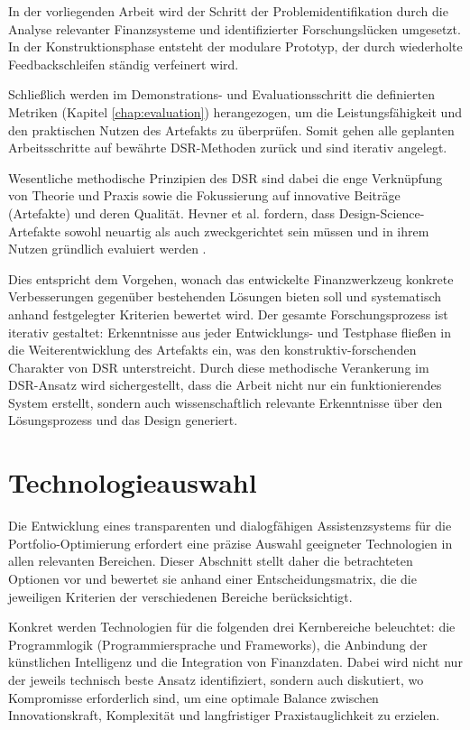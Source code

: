     In der vorliegenden Arbeit wird der Schritt der Problemidentifikation durch die Analyse relevanter Finanzsysteme und identifizierter Forschungslücken umgesetzt.
    In der Konstruktionsphase entsteht der modulare Prototyp, der durch wiederholte Feedbackschleifen ständig verfeinert wird.

    Schließlich werden im Demonstrations- und Evaluationsschritt die definierten Metriken (Kapitel \ref{chap:evaluation}) herangezogen, um die Leistungsfähigkeit und den praktischen Nutzen des Artefakts zu überprüfen.
    Somit gehen alle geplanten Arbeitsschritte auf bewährte \acs{DSR}-Methoden zurück und sind iterativ angelegt.

    Wesentliche methodische Prinzipien des \acs{DSR} sind dabei die enge Verknüpfung von Theorie und Praxis sowie die Fokussierung auf innovative Beiträge (Artefakte) und deren Qualität.
    Hevner et al. fordern, dass Design-Science-Artefakte sowohl neuartig als auch zweckgerichtet sein müssen und in ihrem Nutzen gründlich evaluiert werden \autocite{hevner2004}.

    Dies entspricht dem Vorgehen, wonach das entwickelte Finanzwerkzeug konkrete Verbesserungen gegenüber bestehenden Lösungen bieten soll und systematisch anhand festgelegter Kriterien bewertet wird.
    Der gesamte Forschungsprozess ist iterativ gestaltet:
    Erkenntnisse aus jeder Entwicklungs- und Testphase fließen in die Weiterentwicklung des Artefakts ein, was den konstruktiv-forschenden Charakter von \acs{DSR} unterstreicht.
    Durch diese methodische Verankerung im \acs{DSR}-Ansatz wird sichergestellt, dass die Arbeit nicht nur ein funktionierendes System erstellt, sondern auch wissenschaftlich relevante Erkenntnisse über den Lösungsprozess und das Design generiert.

\section{Technologieauswahl} %

    Die Entwicklung eines transparenten und dialogfähigen Assistenzsystems für die Portfolio-Optimierung erfordert eine präzise Auswahl geeigneter Technologien in allen relevanten Bereichen.
    Dieser Abschnitt stellt daher die betrachteten Optionen vor und bewertet sie anhand einer Entscheidungsmatrix, die die jeweiligen Kriterien der verschiedenen Bereiche berücksichtigt.

    Konkret werden Technologien für die folgenden drei Kernbereiche beleuchtet: die Programmlogik (Programmiersprache und Frameworks), die Anbindung der künstlichen Intelligenz und die Integration von Finanzdaten.
    Dabei wird nicht nur der jeweils technisch beste Ansatz identifiziert, sondern auch diskutiert, wo Kompromisse erforderlich sind, um eine optimale Balance zwischen Innovationskraft, Komplexität und langfristiger Praxistauglichkeit zu erzielen.


